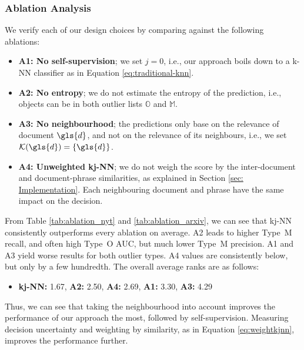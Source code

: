 \subsubsection{Ablation Analysis}
\label{ablationanalysis}

We verify each of our design choices by comparing against the following ablations:  
\begin{itemize}[noitemsep]
    \item \textbf{A1: No self-supervision}; we set $j=0$, i.e., our approach boils down to a k-NN classifier as in Equation \ref{eq:traditional-knn}. \item \textbf{A2: No entropy}; we do not estimate the entropy of the prediction, i.e., objects can be in both outlier lists $\mathbb{O}$ and $\mathbb{M}$.
    \item \textbf{A3: No neighbourhood}; the predictions only base on the relevance of document $\gls{d}$, and not on the relevance of its neighbours, i.e., we set $\mathcal{K}(\gls{d}) = \{\gls{d}\}$. 
    \item \textbf{A4: Unweighted \gls{kj-NN}}; we do not weigh the score by the inter-document and document-phrase similarities, as explained in Section \ref{sec: Implementation}. Each neighbouring document and phrase have the same impact on the decision. 
\end{itemize}
From Table \ref{tab:ablation_nyt} and  \ref{tab:ablation_arxiv}, we can see that \gls{kj-NN} consistently outperforms every ablation on average. A2 leads to higher Type~M recall, and often high Type~O \acrshort{AUC}, but much lower Type~M precision. 
A1 and A3 yield worse results for both outlier types. A4 values are consistently below, but only by a few hundredth. 
The overall average ranks are as follows: 
\begin{itemize}[noitemsep]
    \item \textbf{\gls{kj-NN}:} 1.67, \textbf{A2:} 2.50, \textbf{A4:} 2.69, \textbf{A1:} 3.30, \textbf{A3:} 4.29
\end{itemize}
Thus, we can see that taking the neighbourhood into account improves the performance of our approach the most, followed by self-supervision. Measuring decision uncertainty and weighting by similarity, as in Equation \ref{eq:weightkjnn}, improves the performance further. 


